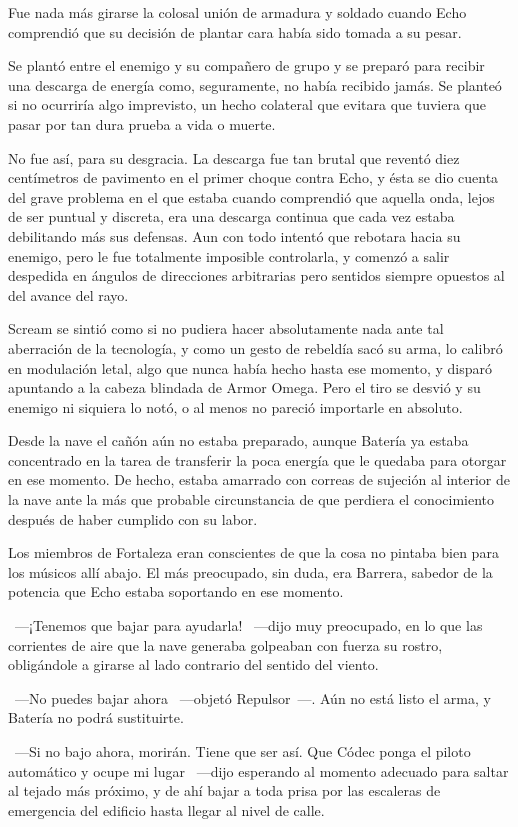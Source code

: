 Fue nada más girarse la colosal unión de armadura y soldado cuando Echo comprendió que su decisión de plantar cara había sido tomada a su pesar.

Se plantó entre el enemigo y su compañero de grupo y se preparó para recibir una descarga de energía como, seguramente, no había recibido jamás. Se planteó si no ocurriría algo imprevisto, un hecho colateral que evitara que tuviera que pasar por tan dura prueba a vida o muerte.

No fue así, para su desgracia. La descarga fue tan brutal que reventó diez centímetros de pavimento en el primer choque contra Echo, y ésta se dio cuenta del grave problema en el que estaba cuando comprendió que aquella onda, lejos de ser puntual y discreta, era una descarga continua que cada vez estaba debilitando más sus defensas. Aun con todo intentó que rebotara hacia su enemigo, pero le fue totalmente imposible controlarla, y comenzó a salir despedida en ángulos de direcciones arbitrarias pero sentidos siempre opuestos al del avance del rayo.

Scream se sintió como si no pudiera hacer absolutamente nada ante tal aberración de la tecnología, y como un gesto de rebeldía sacó su arma, lo calibró en modulación letal, algo que nunca había hecho hasta ese momento, y disparó apuntando a la cabeza blindada de Armor Omega. Pero el tiro se desvió y su enemigo ni siquiera lo notó, o al menos no pareció importarle en absoluto.

Desde la nave el cañón aún no estaba preparado, aunque Batería ya estaba concentrado en la tarea de transferir la poca energía que le quedaba para otorgar en ese momento. De hecho, estaba amarrado con correas de sujeción al interior de la nave ante la más que probable circunstancia de que perdiera el conocimiento después de haber cumplido con su labor.

Los miembros de Fortaleza eran conscientes de que la cosa no pintaba bien para los músicos allí abajo. El más preocupado, sin duda, era Barrera, sabedor de la potencia que Echo estaba soportando en ese momento.

~---¡Tenemos que bajar para ayudarla! ~---dijo muy preocupado, en lo que las corrientes de aire que la nave generaba golpeaban con fuerza su rostro, obligándole a girarse al lado contrario del sentido del viento.

~---No puedes bajar ahora ~---objetó Repulsor~---. Aún no está listo el arma, y Batería no podrá sustituirte.

~---Si no bajo ahora, morirán. Tiene que ser así. Que Códec ponga el piloto automático y ocupe mi lugar ~---dijo esperando al momento adecuado para saltar al tejado más próximo, y de ahí bajar a toda prisa por las escaleras de emergencia del edificio hasta llegar al nivel de calle.

